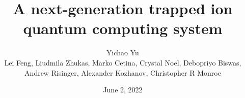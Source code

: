 \documentclass{beamer}
\title[]{A next-generation trapped ion quantum computing system}
\date{June 2, 2022}
\author[Yichao Yu]{Yichao Yu\\
  \vspace{0.5cm}
  {\footnotesize Lei Feng, Liudmila Zhukas, Marko Cetina, Crystal Noel, Debopriyo Biswas,}\\
  {\footnotesize Andrew Risinger, Alexander Kozhanov, Christopher R Monroe}}
\institute{Monroe Group/Duke Quantum Center}
\begin{document}



{
  \begin{frame}{}
    \titlepage
  \end{frame}
}



\end{document}

